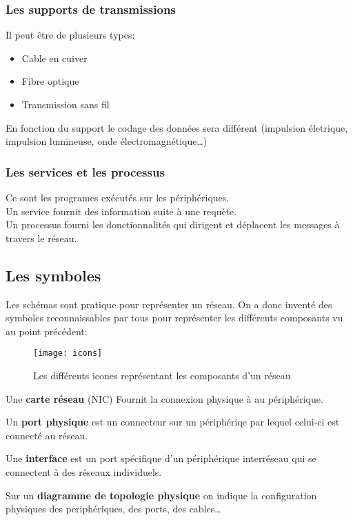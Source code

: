  \subsubsection{Les supports de transmissions}
 Il peut être de plusieurs types:
 \begin{itemize}
	 \item Cable en cuiver
	 \item Fibre optique
	 \item Transmission sans fil
 \end{itemize}
 En fonction du support le codage des données sera différent (impulsion életrique, impulsion lumineuse, onde électromagnétique\ldots)

 \subsubsection{Les services et les processus}
 Ce sont les programes exécutés sur les périphériques.\\
 \indent
 Un service fournit des information suite à une requète.\\
 \indent
 Un processus fourni les donctionnalités qui dirigent et déplacent les messages à travers le réseau.

 \subsection{Les symboles}
 Les schémas sont pratique pour représenter un réseau. On a donc inventé des symboles reconnaissables par tous pour représenter les différents composants vu au point précédent:
 \begin{figure}[h]
	 \centering
	 \texttt{[image: icons]}
	 \caption{Les différents icones représentant les composants d'un réseau}
 \end{figure}

 \smallskip
 \indent
 Une \textbf{carte réseau} (NIC) Fournit la connexion physique à au périphérique.

 \smallskip
 \indent
 Un \textbf{port physique} est un connecteur sur un périphériqe par lequel celui-ci est connecté au réseau.

 \smallskip
 \indent
 Une \textbf{interface} est un port spécifique d'un périphérique interréseau qui se connectent à des réseaux individuels.

 \medskip
 \indent
 Sur un \textbf{diagramme de topologie physique} on indique la configuration physiques des periphériques, des ports, des cables\ldots

